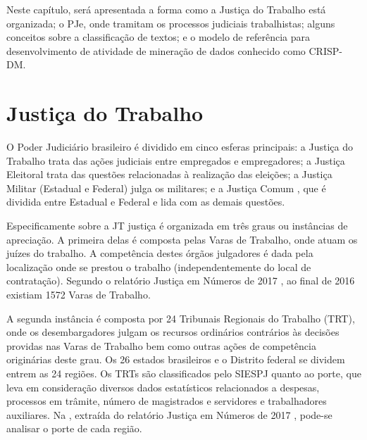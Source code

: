     Neste capítulo, será apresentada a forma como a Justiça do Trabalho está organizada; o PJe, onde tramitam os processos judiciais trabalhistas; alguns conceitos sobre a classificação de textos; e o modelo de referência para desenvolvimento de atividade de mineração de dados conhecido como CRISP-DM. 

\section{Justiça do Trabalho}%

O Poder Judiciário brasileiro é dividido em cinco esferas principais: a Justiça do Trabalho  trata das ações judiciais entre empregados e empregadores; a Justiça Eleitoral trata das questões relacionadas à  realização das eleições;  a Justiça Militar (Estadual e Federal)  julga os militares; e a Justiça Comum , que é dividida entre Estadual e Federal e lida com as demais questões. 

Especificamente sobre a JT justiça é organizada em três graus ou instâncias de apreciação. A primeira delas é composta pelas Varas de Trabalho, onde atuam os juízes do trabalho. A competência destes órgãos julgadores é dada pela localização onde se prestou o trabalho (independentemente do local de contratação). Segundo o relatório Justiça em Números de 2017 \cite{justicaemnumeros2017}, ao final de 2016 existiam 1572 Varas de Trabalho. 

A segunda instância é composta por 24 Tribunais Regionais do Trabalho (TRT), onde os desembargadores julgam os recursos ordinários contrários às decisões providas nas Varas de Trabalho bem como outras ações de competência originárias deste grau. Os 26 estados brasileiros e o Distrito federal se dividem entrem as 24 regiões. Os TRTs são classificados pelo SIESPJ quanto ao porte, que leva em consideração diversos dados estatísticos relacionados a despesas, processos em trâmite, número de magistrados e servidores e trabalhadores auxiliares. Na , extraída do relatório Justiça em Números de 2017 \cite{justicaemnumeros2017}, pode-se analisar o porte de cada região. 

%

